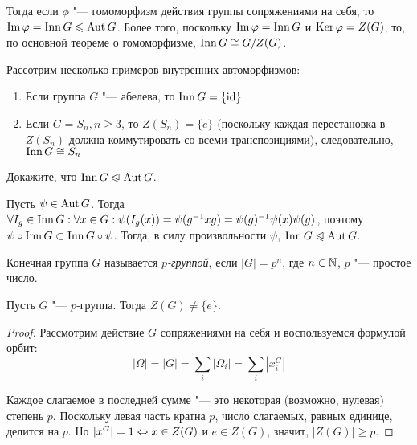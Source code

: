 \begin{note}
	Тогда если $\phi$ "--- гомоморфизм действия группы сопряжениями на себя, то $\im\phi \hm= \Inn G \le \Aut G$. Более того, поскольку $\operatorname{Im}\varphi = \operatorname{Inn} G$ и $\operatorname{Ker}\varphi = Z(G)$, то, по основной теореме о гомоморфизме, $\operatorname{Inn} G \cong G / Z(G)$.
\end{note}

\begin{example}
	Рассотрим несколько примеров внутренних автоморфизмов:
	\begin{enumerate}
		\item Если группа $G$ "--- абелева, то $\operatorname{Inn}{G} = \{\operatorname{id}\}$
		\item Если $G = S_n, n \ge 3$, то $Z(S_n) = \{e\}$ (поскольку каждая перестановка в $Z(S_n)$ должна коммутировать со всеми транспозициями), следовательно, $\operatorname{Inn}{G} \cong S_n$
	\end{enumerate}
\end{example}

\begin{exercise}
	Докажите, что $\operatorname{Inn}{G} \trianglelefteqslant \operatorname{Aut}{G}$.
\end{exercise}

\begin{solution}
	Пусть $\psi \in \operatorname{Aut}{G}$. Тогда $\forall I_g \in \Inn{G}: \forall x \hm\in G: \psi(I_g(x)) \hm= \psi(g^{-1}xg) \hm= \psi(g)^{-1}\psi(x)\psi(g)$, поэтому $\psi\circ\operatorname{Inn}{G} \subset \operatorname{Inn}{G}\circ\psi$. Тогда, в силу произвольности $\psi$, $\Inn{G} \hm\normal \Aut{G}$.
\end{solution}

\begin{definition}
	Конечная группа $G$ называется \textit{$p$-группой}, если $|G| = p^n$, где $n \in \mathbb{N}$, $p$ "--- простое число.
\end{definition}

\begin{theorem}
	Пусть $G$ "--- $p$-группа. Тогда $Z(G) \ne \{e\}$.
\end{theorem}

\begin{proof}
	Рассмотрим действие $G$ сопряжениями на себя и воспользуемся формулой орбит:
	\[|\Omega| = |G| = \sum\limits_i |\Omega_i| = \sum\limits_i |x_i^G|\]
	
	Каждое слагаемое в последней сумме "--- это некоторая (возможно, нулевая) степень $p$. Поскольку левая часть кратна $p$, число слагаемых, равных единице, делится на $p$. Но $|x^G| = 1 \Leftrightarrow x \in Z(G)$ и $e \in Z(G)$, значит, $|Z(G)| \ge p$.
\end{proof}

